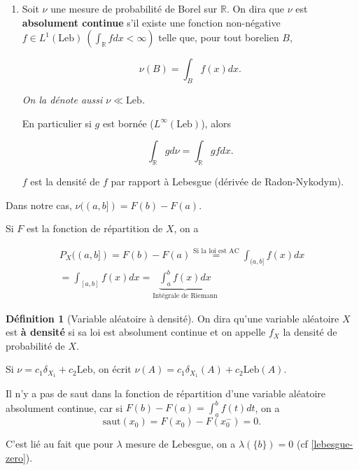 \documentclass[french]{book}
\theoremstyle{definition}
\newtheorem{protodefinition}{Définition}[section]
\newenvironment{definition}
    {\colorlet{shadecolor}{green!5}\begin{shaded}\begin{protodefinition}}
    {\end{protodefinition}\end{shaded}}
\theoremstyle{remark}
\newcommand{\lesss}{<}
\newcommand{\less}{\lesss}
\begin{document}
\begin{enumerate}
  \item Soit $\nu$ une mesure de probabilité de Borel sur $\mathbb{R}$. On dira que $\nu$ est \textbf{absolument continue} s'il existe une fonction non-négative $f \in L ^{1}(\text{Leb}) \ (\int_{\mathbb{R}}^{} f dx \less \infty )$ telle que, pour tout borelien $B$,

  \begin{equation*}
    \nu(B) = \int_{B}^{} f(x) dx.
  \end{equation*}

  \emph{On la dénote aussi $\nu \ll \text{Leb}$.}

  En particulier si $g$ est bornée ($L ^{\infty}(\text{Leb})$), alors

  \begin{equation*}
    \int_{\mathbb{R}}^{} g d \nu = \int_{\mathbb{R}}^{} gf dx.
  \end{equation*}

  $f$ est la densité de $f$ par rapport à Lebesgue (dérivée de Radon-Nykodym).

\end{enumerate}

Dans notre cas, $\nu((a,b]) = F(b)-F(a)$.

Si $F$ est la fonction de répartition de $X$, on a

\begin{gather*}
  P_X((a,b]) = F(b)-F(a) \stackrel{\text{Si la loi est AC}}{=} \int_{(a,b]}^{} f(x)dx \\
   = \int_{[a,b]}^{} f(x) dx = \underbrace{\int_{a}^{b} f(x) dx }_{\text{Intégrale de Riemann}}
\end{gather*}

\begin{definition}[Variable aléatoire à densité]
  On dira qu'une variable aléatoire $X$ est \textbf{à densité} si sa loi est absolument continue et on appelle $f_X$ la densité de probabilité de $X$.
\end{definition}

Si $\nu = c_1 \delta _{X_1} + c_2 \text{Leb}$, on écrit $\nu(A) = c_1 \delta _{X_1}(A) + c_2 \text{Leb} (A)$.

Il n'y a pas de saut dans la fonction de répartition d'une variable aléatoire absolument continue, car si $F(b) - F(a) = \int_{a}^{b} f(t) dt $, on a $$\text{saut}(x_0) = F(x_0) - F(x_0 ^{-}) = 0.$$

C'est lié au fait que pour $\lambda$ mesure de Lebesgue, on a $\lambda (\{ b \} ) = 0$ (cf \ref{lebesgue-zero}).
\end{document}
